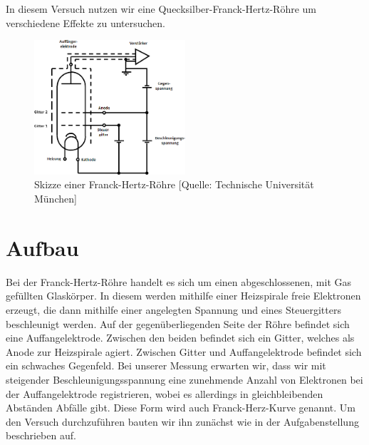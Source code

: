 In diesem Versuch nutzen wir eine Quecksilber-Franck-Hertz-Röhre um verschiedene Effekte zu untersuchen.
\begin{figure}
	\centering
	\includegraphics[width=0.5\textwidth]{../Daten/Aufgabe1/Aufbau.png}
	\caption{Skizze einer Franck-Hertz-Röhre [Quelle: Technische Universität München]}
\end{figure}
\section{Aufbau}
Bei der Franck-Hertz-Röhre handelt es sich um einen abgeschlossenen, mit Gas gefüllten Glaskörper. In diesem werden mithilfe einer Heizspirale freie Elektronen erzeugt, die dann mithilfe einer angelegten Spannung und eines Steuergitters beschleunigt werden. Auf der gegenüberliegenden Seite der Röhre befindet sich eine Auffangelektrode. Zwischen den beiden befindet sich ein Gitter, welches als Anode zur Heizspirale agiert. Zwischen Gitter und Auffangelektrode befindet sich ein schwaches Gegenfeld. Bei unserer Messung erwarten wir, dass wir mit steigender Beschleunigungsspannung eine zunehmende Anzahl von Elektronen bei der Auffangelektrode registrieren, wobei es allerdings in gleichbleibenden Abständen Abfälle gibt. Diese Form wird auch Franck-Herz-Kurve genannt. Um den Versuch durchzuführen bauten wir ihn zunächst wie in der Aufgabenstellung beschrieben auf.
